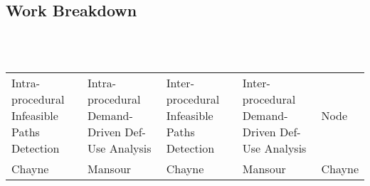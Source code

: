 \documentclass{article}
\begin{document}
\subsection{Work Breakdown}
~\\~
\begin{adjustbox}{center}
\renewcommand{\arraystretch}{2}
\begin{tabular}{| C{3cm} | C{3cm} | C{3cm} | C{3cm} | C{3cm} |}
\hline
Intra-procedural Infeasible Paths Detection & Intra-procedural Demand-Driven Def-Use Analysis & Inter-procedural Infeasible Paths Detection  & Inter-procedural Demand-Driven Def-Use Analysis & Node \\  
Chayne & Mansour & Chayne & Mansour & Chayne \\ 

\end{tabular}
\end{adjustbox}
\end{document}
